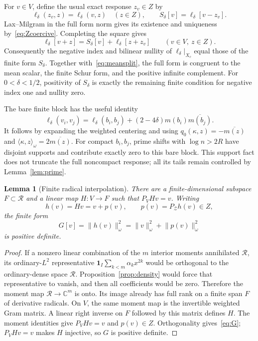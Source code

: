 \documentclass[11pt,a4paper]{article}
\numberwithin{equation}{section}
\newtheorem{lemma}[theorem]{Lemma}
\theoremstyle{remark}
\newcommand{\C}{\mathbb C}
\newcommand{\ip}[2]{\langle #1,#2\rangle}
\newcommand{\norm}[1]{\lVert #1\rVert}
\newcommand{\one}{\mathbf 1}
\newcommand{\Zc}{\mathcal Z}
\newcommand{\Rcal}{\mathcal R}
\begin{document}
For $v\in V$, define the usual exact response $z_v\in Z$ by
\begin{equation}\label{eq:usualresponse}
 \ell_\delta(z_v,z)=\ell_\delta(v,z)\quad(z\in Z),\qquad
 S_\delta[v]=\ell_\delta[v-z_v].
\end{equation}
Lax--Milgram in the full form norm gives its existence and uniqueness by~\eqref{eq:Zcoercive}. Completing the square gives
\begin{equation}\label{eq:usualsquare}
 \ell_\delta[v+z]=S_\delta[v]+\ell_\delta[z+z_v]
                         \qquad(v\in V,\ z\in Z).
\end{equation}
Consequently the negative index and bilinear nullity of $\ell_\delta|_{X_c}$ equal those of the finite form $S_\delta$. Together with~\eqref{eq:meansplit}, the full form is congruent to the mean scalar, the finite Schur form, and the positive infinite complement. For $0<\delta<1/2$, positivity of $S_\delta$ is exactly the remaining finite condition for negative index one and nullity zero.

The bare finite block has the useful identity
\begin{equation}\label{eq:bareblock}
 \ell_\delta(v_i,v_j)=\ell_\delta(b_i,b_j)
       +(2-4\delta)m(b_i)\overline{m(b_j)}.
\end{equation}
It follows by expanding the weighted centering and using
$q_0(\kappa,z)=-\overline{m(z)}$ and
$\ip\kappa z_\omega=2\overline{m(z)}$.
For compact $b_i,b_j$, prime shifts with $\log n>2R$ have disjoint supports and contribute exactly zero to this bare block. This support fact does not truncate the full noncompact response; all its tails remain controlled by Lemma~\ref{lem:prime}.

\begin{lemma}[Finite radical interpolation]\label{lem:lift}
There are a finite-dimensional subspace $F\subset\Rcal$ and a linear map $H:V\to F$ such that $P_VHv=v$. Writing
\begin{equation}\label{eq:liftdata}
 h(v)=Hv=v+p(v),\qquad p(v)=P_{\Zc}h(v)\in Z,
\end{equation}
the finite form
\begin{equation}\label{eq:G}
 G[v]=\norm{h(v)}_\omega^2
     =\norm v_\omega^2+\norm{p(v)}_\omega^2
\end{equation}
is positive definite.
\end{lemma}
\begin{proof}
If a nonzero linear combination of the $m$ interior moments annihilated $\Rcal$, its ordinary-$L^2$ representative
$\one_I\sum_{k<m}\alpha_kx^{2k}$ would be orthogonal to the ordinary-dense space $\Rcal$. Proposition~\ref{prop:density} would force that representative to vanish, and then all coefficients would be zero. Therefore the moment map $\Rcal\to\C^m$ is onto. Its image already has full rank on a finite span $F$ of derivative radicals. On $V$, the same moment map is the invertible weighted Gram matrix. A linear right inverse on $F$ followed by this matrix defines $H$. The moment identities give $P_VHv=v$ and $p(v)\in Z$. Orthogonality gives~\eqref{eq:G}; $P_VHv=v$ makes $H$ injective, so $G$ is positive definite.
\end{proof}
\end{document}
